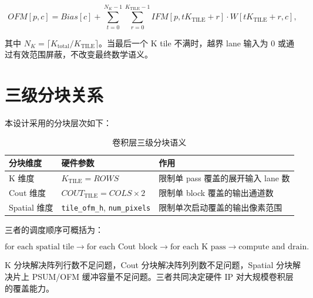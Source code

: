 \documentclass[fontset=fandol,ugly,language=chinese]{pkuthss}
\newcommand{\signal}[1]{\texttt{#1}}
\newcommand{\KTILE}{K_{\mathrm{TILE}}}
\newcommand{\COUTTILE}{COUT_{\mathrm{TILE}}}
\newcommand{\KTOTAL}{K_{\mathrm{total}}}
\begin{document}
\begin{equation}
OFM[p,c] =
Bias[c] +
\sum_{t=0}^{N_K-1}
\sum_{r=0}^{\KTILE-1}
IFM[p,t\KTILE+r] \cdot W[t\KTILE+r,c],
\label{eq:k_tiled}
\end{equation}

其中 $N_K=\lceil \KTOTAL/\KTILE \rceil$。当最后一个 K tile 不满时，越界 lane 输入为 0 或通过有效范围屏蔽，不改变最终数学语义。

\section{三级分块关系}

本设计采用的分块层次如下：

\begin{table}[htbp]
\centering
\caption{卷积层三级分块语义}
\label{tab:tiling_summary}
\begin{tabular}{lll}
\toprule
\textbf{分块维度} & \textbf{硬件参数} & \textbf{作用} \\
\midrule
K 维度 & $\KTILE=ROWS$ & 限制单 pass 覆盖的展开输入 lane 数 \\
Cout 维度 & $\COUTTILE=COLS\times2$ & 限制单 block 覆盖的输出通道数 \\
Spatial 维度 & \signal{tile\_ofm\_h}, \signal{num\_pixels} & 限制单次启动覆盖的输出像素范围 \\
\bottomrule
\end{tabular}
\end{table}

三者的调度顺序可概括为：

\begin{equation}
\text{for each spatial tile}
\rightarrow
\text{for each Cout block}
\rightarrow
\text{for each K pass}
\rightarrow
\text{compute and drain}.
\end{equation}

K 分块解决阵列行数不足问题，Cout 分块解决阵列列数不足问题，Spatial 分块解决片上 PSUM/OFM 缓冲容量不足问题。三者共同决定硬件 IP 对大规模卷积层的覆盖能力。
\end{document}
